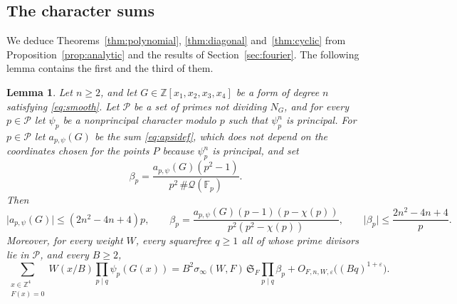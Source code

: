 \documentclass[11pt]{amsart}
\numberwithin{equation}{section}
\numberwithin{figure}{section}
\newtheorem{lemma}{Lemma}[section]
\theoremstyle{definition}
\newcommand{\Z}{\mathbb{Z}}
\newcommand{\F}{\mathcal{F}}
\renewcommand{\S}{\mathfrak{S}}
\newcommand{\eps}{\varepsilon}
\newcommand{\abs}[1]{\lvert #1\rvert}
\newcommand{\Fp}{\mathbb F_p}
\newcommand{\Qc}{\mathcal Q}
\begin{document}
\subsection{The character sums}\label{sec:character-sums}

We deduce Theorems~\ref{thm:polynomial}, \ref{thm:diagonal}
and~\ref{thm:cyclic} from Proposition~\ref{prop:analytic} and the
results of Section~\ref{sec:fourier}. The following lemma contains
the first and the third of them.

\begin{lemma}\label{lem:charsum}
Let $n\ge2$, and let $G\in\Z[x_1,x_2,x_3,x_4]$ be a form of degree
$n$ satisfying \eqref{eq:smooth}. Let $\mathcal P$ be a set of primes
not dividing $N_G$, and for every $p\in\mathcal P$ let $\psi_p$ be a
nonprincipal character modulo $p$ such that $\psi_p^n$ is principal.
For $p\in\mathcal P$ let $a_{p,\psi}(G)$ be the sum
\eqref{eq:apsidef}, which does not depend on the coordinates chosen
for the points $P$ because $\psi_p^n$ is principal, and set
\begin{equation}\label{eq:localfactor}
 \beta_p=\frac{a_{p,\psi}(G)(p^2-1)}{p^2\,\#\Qc(\Fp)}.
\end{equation}
Then
\begin{equation}\label{eq:betabound}
 \abs{a_{p,\psi}(G)}\le(2n^2-4n+4)p,\qquad
 \beta_p=\frac{a_{p,\psi}(G)(p-1)(p-\chi(p))}{p^2(p^2-\chi(p))},\qquad
 \abs{\beta_p}\le\frac{2n^2-4n+4}p.
\end{equation}
Moreover, for every weight $W$, every squarefree $q\ge1$ all of whose
prime divisors lie in $\mathcal P$, and every $B\ge2$,
\begin{equation}\label{eq:charsum}
 \sum_{\substack{x\in\Z^4\\F(x)=0}}W(x/B)\prod_{p\mid q}\psi_p(G(x))
 =B^2\sigma_\infty(W,F)\,\S_F\prod_{p\mid q}\beta_p
 +O_{F,n,W,\eps}\big((Bq)^{1+\eps}\big).
\end{equation}
\end{lemma}
\end{document}
